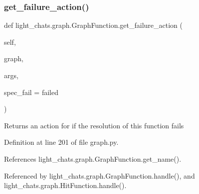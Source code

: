 \subsubsection{\texorpdfstring{get\+\_\+failure\+\_\+action()}{get\_failure\_action()}}
{\footnotesize\ttfamily def light\+\_\+chats.\+graph.\+Graph\+Function.\+get\+\_\+failure\+\_\+action (\begin{DoxyParamCaption}\item[{}]{self,  }\item[{}]{graph,  }\item[{}]{args,  }\item[{}]{spec\+\_\+fail = {\ttfamily \textquotesingle{}failed\textquotesingle{}} }\end{DoxyParamCaption})}

\begin{DoxyVerb}Returns an action for if the resolution of this function fails\end{DoxyVerb}
 

Definition at line 201 of file graph.\+py.



References light\+\_\+chats.\+graph.\+Graph\+Function.\+get\+\_\+name().



Referenced by light\+\_\+chats.\+graph.\+Graph\+Function.\+handle(), and light\+\_\+chats.\+graph.\+Hit\+Function.\+handle().

